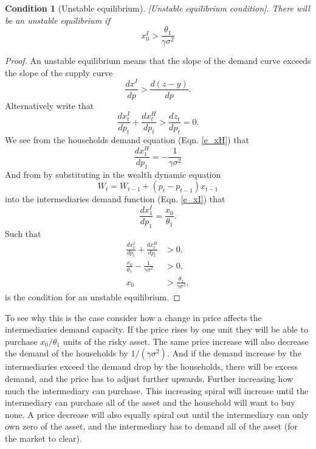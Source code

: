\documentclass[11pt]{article}
\newtheorem{condition}{Condition}
\begin{document}
\begin{condition}[Unstable equilibrium] \label{c_unstable}
[Unstable equilibrium condition]. There will be an unstable equilibrium if
\begin{equation}
x_0^I > \frac{\theta_1}{\gamma \sigma^2}
\end{equation}
\end{condition}
\begin{proof}
An unstable equilibrium means that the slope of the demand curve exceeds the slope of the supply curve
\begin{equation*}
\frac{d x^I}{dp} > \frac{ d (z-y)}{dp}.
\end{equation*}
Alternatively write that 
\begin{equation*}
\frac{d x^I_t}{dp_t} + \frac{d x^H_t}{dp_t} > \frac{dz_t}{dp_t} = 0.
\end{equation*}
We see from the households demand equation (Eqn. \ref{e_xH}) that 
\begin{equation*}
\frac{d x^H_1}{dp_1} = -\frac{1}{\gamma \sigma^2}
\end{equation*}
And from by substituting in the wealth dynamic equation
\begin{equation}
W_{t} = W_{t-1} + (p_{t}-p_{t-1})x_{t-1}
\end{equation}
into the intermediaries demand function (Eqn. \ref{e_xI}) that
\begin{equation*}
\frac{d x^I_1}{dp_1} = \frac{x_0}{\theta_1}.
\end{equation*}
Such that
\begin{align*}
\frac{d x^I_t}{dp_t} + \frac{d x^H_t}{dp_t} &> 0,\\
\frac{x_0}{\theta_1} - \frac{1}{\gamma \sigma^2} &> 0,\\
x_0 &> \frac{\theta_1}{\gamma \sigma^2},
\end{align*}
is the condition for an unstable equilibrium.
\end{proof}

To see why this is the case consider how a change in price affects the intermediaries demand capacity. If the price rises by one unit they will be able to purchase $x_0/\theta_1$ units of the risky asset. The same price increase will also decrease the demand of the households by $1/(\gamma \sigma^2)$. And if the demand increase by the intermediaries exceed the demand drop by the households, there will be excess demand, and the price has to adjust further upwards. Further increasing how much the intermediary can purchase. This increasing spiral will increase until the intermediary can purchase all of the asset and the household will want to buy none. A price decrease will also equally spiral out until the intermediary can only own zero of the asset, and the intermediary has to demand all of the asset (for the market to clear). 
\end{document}
